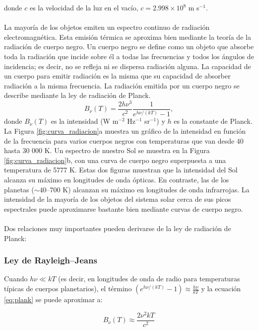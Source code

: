 \documentclass[12pt]{article}
\begin{document}
donde $c$ es la velocidad de la luz en el vacío, $c = 2.998 \times 10^8$ m s$^{-1}$.\\
\\
La mayoría de los objetos emiten un espectro continuo de radiación electromagnética. Esta emisión térmica
se aproxima bien mediante la teoría de la radiación de cuerpo negro. Un cuerpo negro se define como un objeto
que absorbe toda la radiación que incide sobre él a todas las frecuencias y todos los ángulos de incidencia; 
es decir, no se refleja ni se dispersa radiación alguna. La capacidad de un cuerpo para emitir radiación es 
la misma que su capacidad de absorber radiación a la misma frecuencia. La radiación emitida por un cuerpo 
negro se describe mediante la ley de radiación de Planck.
\begin{equation}
    B_{\nu} (T) = \frac{2h\nu^3}{c^2} \frac{1}{e^{h\nu/(kT)} - 1},
    \label{eq:plank}
\end{equation}
donde $B_{\nu} (T)$ es la intensidad (W m$^{-2}$ Hz$^{-1}$ sr$^{-1}$) y $h$ es la constante de Planck. 
La Figura \ref{fig:curva_radiacion}a muestra un gráfico de la intensidad en función de la frecuencia 
para varios cuerpos negros con temperaturas que van desde 40 hasta 30 000 K. Un espectro de nuestro 
Sol se muestra en la Figura \ref{fig:curva_radiacion}b, con una curva de cuerpo negro superpuesta a 
una temperatura de 5777 K. Estas dos figuras muestran que la intensidad del Sol alcanza su máximo en 
longitudes de onda ópticas. En contraste, las de los planetas ($\sim$40–700 K) alcanzan su máximo en 
longitudes de onda infrarrojas. La intensidad de la mayoría de los objetos del sistema solar cerca de 
sus picos espectrales puede aproximarse bastante bien mediante curvas de cuerpo negro.\\
\\
Dos relaciones muy importantes pueden derivarse de la ley de radiación de Planck:
\subsubsection{Ley de Rayleigh–Jeans}

Cuando $h\nu \ll kT$ (es decir, en longitudes de onda de radio para temperaturas típicas de cuerpos planetarios), 
el término $(e^{h\nu/(kT)} - 1) \approx \frac{h\nu}{kT}$ y la ecuación \ref{eq:plank} se puede aproximar a:

\begin{equation}
    B_\nu (T) \approx \frac{2\nu^2 kT}{c^2}
    \label{eq:Rayleigh}
\end{equation}
\end{document}
